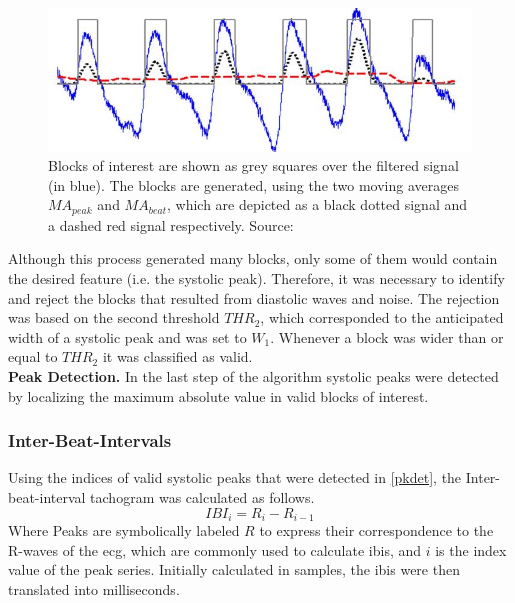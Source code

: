 \begin{figure}[h!]
	\centering
  \includegraphics[width=1.0\textwidth, angle=0]{images/bvp_dta.jpg}
	\caption[Peak Detection Algorithm]{Blocks of interest are shown as grey squares over the filtered signal (in blue). The blocks are generated, using the two moving averages $MA_{peak}$ and $MA_{beat}$, which are depicted as a black dotted signal and a dashed red signal respectively. Source: \cite{Elgendi2013}}
	\label{bvp_dta}
\end{figure}

Although this process generated many blocks, only some of them would contain the desired feature (i.e. the systolic peak). Therefore, it was necessary to identify and reject the blocks that resulted from diastolic waves and noise. The rejection was based on the second threshold $THR_{2}$, which corresponded to the anticipated width of a systolic peak and was set to $W_{1}$. Whenever a block was wider than or equal to $THR_{2}$ it was classified as valid.\\
\textbf{Peak Detection.}\label{pkdet} In the last step of the algorithm systolic peaks were detected by localizing the maximum absolute value in valid blocks of interest. 

\subsubsection{Inter-Beat-Intervals}
Using the indices of valid systolic peaks that were detected in \ref{pkdet}, the Inter-beat-interval tachogram was calculated as follows.
\begin{equation}
IBI_{i} = R_{i}-R_{i-1}
\end{equation}
Where Peaks are symbolically labeled $R$ to express their correspondence to the R-waves of the \gls{ecg}, which are commonly used to calculate \gls{ibi}s, and $i$ is the index value of the peak series.
Initially calculated in samples, the \gls{ibi}s were then translated into milliseconds.

